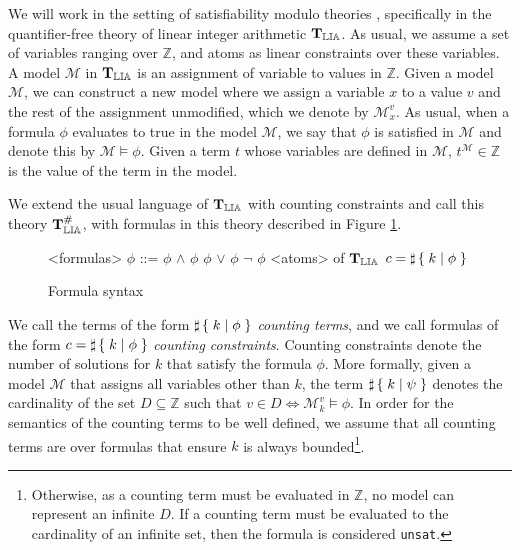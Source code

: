 
We will work in the setting of satisfiability modulo theories
\cite{barrett2009satisfiability}, specifically in the quantifier-free
theory of linear integer arithmetic $\operatorname{\mathbf{T}_{\mathbb{LIA}}}$. As usual, we assume a
set of variables ranging over $\mathbb{Z}$, and atoms as linear
constraints over these variables. A model $\mathcal{M}$ in $\operatorname{\mathbf{T}_{\mathbb{LIA}}}$ is
an assignment of variable to values in $\mathbb{Z}$. Given a model
$\mathcal{M}$, we can construct a new model where we assign a variable
$x$ to a value $v$ and the rest of the assignment unmodified, which we
denote by $\mathcal{M}^v_x$. As usual, when a formula $\phi$
evaluates to true in the model $\mathcal{M}$, we say that $\phi$ is
satisfied in $\mathcal{M}$ and denote this by $\mathcal{M} \vDash
\phi$. Given a term $t$ whose variables are defined in $\mathcal{M}$,
$t^\mathcal{M} \in \mathbb{Z}$ is the value of the term in the model.

We extend the usual language of $\operatorname{\mathbf{T}_{\mathbb{LIA}}}$ with counting constraints and
call this theory $\operatorname{\mathbf{T}^\#_{\mathbb{LIA}}}$, with formulas in this theory described in
Figure \ref{formula}.

\begin{figure}[h]
\begin{grammar}
<formulas> $\phi$ ::= $\phi$ $\land$ $\phi$
\alt $\phi$ $\lor$ $\phi$
\alt $\lnot$ $\phi$
\alt <atoms> of $\operatorname{\mathbf{T}_{\mathbb{LIA}}}$
\alt $c = \sharp\left\lbrace\;k\;|\;\phi\;\right\rbrace$
\end{grammar}

\caption{Formula syntax}
\label{formula}
\end{figure}

We call the terms of the form $\sharp\left\lbrace\;k\;|\;\phi\;\right\rbrace$ \emph{counting
terms}, and we call formulas of the form $c = \sharp\left\lbrace\;k\;|\;\phi\;\right\rbrace$
\emph{counting constraints}. 
Counting constraints denote the number of solutions for $k$
that satisfy the formula $\phi$.
More formally, given a model $\mathcal{M}$ that
assigns all variables other than $k$, the term $\sharp\left\lbrace\;k\;|\;\psi\;\right\rbrace$
denotes the cardinality of the set $D \subseteq \mathbb{Z}$ such that
$v \in D \iff \mathcal{M}^v_k \vDash \phi$. In order for the semantics
of the counting terms to be well defined, we assume that all counting
terms are over formulas that ensure $k$ is always bounded\footnote{Otherwise, as
a counting term must be evaluated in $\mathbb{Z}$, no model can represent an
infinite $D$. If a counting term must be evaluated to the cardinality of an infinite set, then the formula is considered \texttt{unsat}.}.

